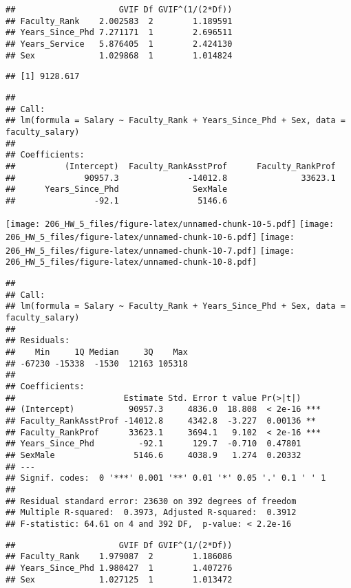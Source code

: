 \documentclass[]{article}
\begin{document}
\begin{verbatim}
##                     GVIF Df GVIF^(1/(2*Df))
## Faculty_Rank    2.002583  2        1.189591
## Years_Since_Phd 7.271171  1        2.696511
## Years_Service   5.876405  1        2.424130
## Sex             1.029868  1        1.014824
\end{verbatim}

\begin{verbatim}
## [1] 9128.617
\end{verbatim}

\begin{verbatim}
## 
## Call:
## lm(formula = Salary ~ Faculty_Rank + Years_Since_Phd + Sex, data = faculty_salary)
## 
## Coefficients:
##          (Intercept)  Faculty_RankAsstProf      Faculty_RankProf  
##              90957.3              -14012.8               33623.1  
##      Years_Since_Phd               SexMale  
##                -92.1                5146.6
\end{verbatim}

\texttt{[image: 206\_HW\_5\_files/figure-latex/unnamed-chunk-10-5.pdf]}
\texttt{[image: 206\_HW\_5\_files/figure-latex/unnamed-chunk-10-6.pdf]}
\texttt{[image: 206\_HW\_5\_files/figure-latex/unnamed-chunk-10-7.pdf]}
\texttt{[image: 206\_HW\_5\_files/figure-latex/unnamed-chunk-10-8.pdf]}

\begin{verbatim}
## 
## Call:
## lm(formula = Salary ~ Faculty_Rank + Years_Since_Phd + Sex, data = faculty_salary)
## 
## Residuals:
##    Min     1Q Median     3Q    Max 
## -67230 -15338  -1530  12163 105318 
## 
## Coefficients:
##                      Estimate Std. Error t value Pr(>|t|)    
## (Intercept)           90957.3     4836.0  18.808  < 2e-16 ***
## Faculty_RankAsstProf -14012.8     4342.8  -3.227  0.00136 ** 
## Faculty_RankProf      33623.1     3694.1   9.102  < 2e-16 ***
## Years_Since_Phd         -92.1      129.7  -0.710  0.47801    
## SexMale                5146.6     4038.9   1.274  0.20332    
## ---
## Signif. codes:  0 '***' 0.001 '**' 0.01 '*' 0.05 '.' 0.1 ' ' 1
## 
## Residual standard error: 23630 on 392 degrees of freedom
## Multiple R-squared:  0.3973, Adjusted R-squared:  0.3912 
## F-statistic: 64.61 on 4 and 392 DF,  p-value: < 2.2e-16
\end{verbatim}

\begin{verbatim}
##                     GVIF Df GVIF^(1/(2*Df))
## Faculty_Rank    1.979087  2        1.186086
## Years_Since_Phd 1.980427  1        1.407276
## Sex             1.027125  1        1.013472
\end{verbatim}
\end{document}
